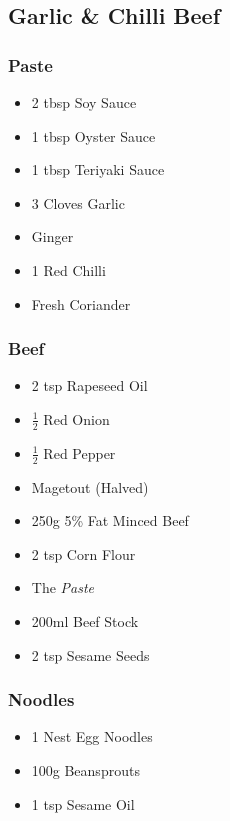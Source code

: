 \documentclass[11pt, english]{article}
\begin{document}
	\subsection{Garlic \& Chilli Beef}

		\subsubsection*{Paste}

	\begin{itemize}
        \setlength\itemsep{0cm}
                \item 2 tbsp Soy Sauce
		\item 1 tbsp Oyster Sauce
		\item 1 tbsp Teriyaki Sauce
		\item 3 Cloves Garlic
		\item Ginger
		\item 1 Red Chilli
		\item Fresh Coriander 
        \end{itemize}

		\subsubsection*{Beef}

	\begin{itemize}
        \setlength\itemsep{0cm}
                \item 2 tsp Rapeseed Oil
		\item $\frac{1}{2}$ Red Onion
		\item $\frac{1}{2}$ Red Pepper
		\item Magetout (Halved)
		\item 250g 5\% Fat Minced Beef
		\item 2 tsp Corn Flour
		\item The \textit{Paste}
		\item 200ml Beef Stock
		\item 2 tsp Sesame Seeds
        \end{itemize}

		\subsubsection*{Noodles}

	\begin{itemize}
        \setlength\itemsep{0cm}
                \item 1 Nest Egg Noodles
		\item 100g Beansprouts
		\item 1 tsp Sesame Oil
        \end{itemize}
\end{document}
